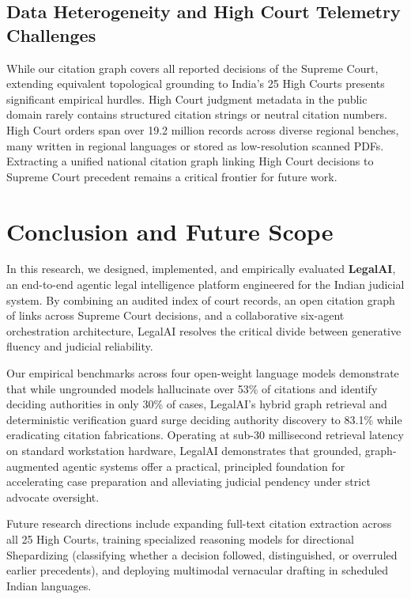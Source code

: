 \documentclass[conference]{IEEEtran}
\begin{document}
\subsection{Data Heterogeneity and High Court Telemetry Challenges}
While our citation graph covers all reported decisions of the Supreme Court, extending equivalent topological grounding to India's 25 High Courts presents significant empirical hurdles. High Court judgment metadata in the public domain rarely contains structured citation strings or neutral citation numbers. High Court orders span over 19.2 million records across diverse regional benches, many written in regional languages or stored as low-resolution scanned PDFs. Extracting a unified national citation graph linking High Court decisions to Supreme Court precedent remains a critical frontier for future work.

\newpage
\section{Conclusion and Future Scope}
\label{sec:conclusion}
In this research, we designed, implemented, and empirically evaluated \textbf{LegalAI}, an end-to-end agentic legal intelligence platform engineered for the Indian judicial system. By combining an audited index of \CorpusTotal{} court records, an open citation graph of \GraphEdges{} links across \GraphTextOK{} Supreme Court decisions, and a collaborative six-agent orchestration architecture, LegalAI resolves the critical divide between generative fluency and judicial reliability.

Our empirical benchmarks across four open-weight language models demonstrate that while ungrounded models hallucinate over 53\% of citations and identify deciding authorities in only 30\% of cases, LegalAI's hybrid graph retrieval and deterministic verification guard surge deciding authority discovery to 83.1\% while eradicating citation fabrications. Operating at sub-30 millisecond retrieval latency on standard workstation hardware, LegalAI demonstrates that grounded, graph-augmented agentic systems offer a practical, principled foundation for accelerating case preparation and alleviating judicial pendency under strict advocate oversight.

Future research directions include expanding full-text citation extraction across all 25 High Courts, training specialized reasoning models for directional Shepardizing (classifying whether a decision followed, distinguished, or overruled earlier precedents), and deploying multimodal vernacular drafting in scheduled Indian languages.
\end{document}
